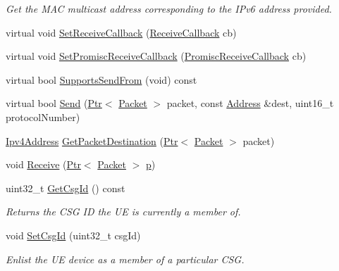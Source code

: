 \begin{DoxyCompactItemize}
\begin{DoxyCompactList}\small\item\em Get the M\+AC multicast address corresponding to the I\+Pv6 address provided. \end{DoxyCompactList}\item 
virtual void \hyperlink{classns3_1_1McUeNetDevice_acc76ec6194b7a24a63da77269c8389fc}{Set\+Receive\+Callback} (\hyperlink{classns3_1_1NetDevice_ad5e5e1ca187472bc2ba99575d8def568}{Receive\+Callback} cb)
\item 
virtual void \hyperlink{classns3_1_1McUeNetDevice_a4e3344996e03e7987f8f2b0ec6ecf4f6}{Set\+Promisc\+Receive\+Callback} (\hyperlink{classns3_1_1NetDevice_a427225795919f26c414bee2ea3f31ed2}{Promisc\+Receive\+Callback} cb)
\item 
virtual bool \hyperlink{classns3_1_1McUeNetDevice_ae0f6ba182d45774ba4c143c8b89ba973}{Supports\+Send\+From} (void) const 
\item 
virtual bool \hyperlink{classns3_1_1McUeNetDevice_aeea1cc7d81bc988fe7be435cbc94e1bf}{Send} (\hyperlink{classns3_1_1Ptr}{Ptr}$<$ \hyperlink{classns3_1_1Packet}{Packet} $>$ packet, const \hyperlink{classns3_1_1Address}{Address} \&dest, uint16\+\_\+t protocol\+Number)
\item 
\hyperlink{classns3_1_1Ipv4Address}{Ipv4\+Address} \hyperlink{classns3_1_1McUeNetDevice_a64de447290003b152ccc8d509006338f}{Get\+Packet\+Destination} (\hyperlink{classns3_1_1Ptr}{Ptr}$<$ \hyperlink{classns3_1_1Packet}{Packet} $>$ packet)
\item 
void \hyperlink{classns3_1_1McUeNetDevice_ad4fd6a0c68cb71e07a6bc4921f12fb7e}{Receive} (\hyperlink{classns3_1_1Ptr}{Ptr}$<$ \hyperlink{classns3_1_1Packet}{Packet} $>$ \hyperlink{lte__link__budget__x2__handover__measures_8m_ac9de518908a968428863f829398a4e62}{p})
\item 
uint32\+\_\+t \hyperlink{classns3_1_1McUeNetDevice_a064ec192432596ca55148753d8b458c5}{Get\+Csg\+Id} () const 
\begin{DoxyCompactList}\small\item\em Returns the C\+SG ID the UE is currently a member of. \end{DoxyCompactList}\item 
void \hyperlink{classns3_1_1McUeNetDevice_a33217f5cc765e2ddb3c5689115b165b2}{Set\+Csg\+Id} (uint32\+\_\+t csg\+Id)
\begin{DoxyCompactList}\small\item\em Enlist the UE device as a member of a particular C\+SG. \end{DoxyCompactList}\item 

\end{DoxyCompactItemize}
